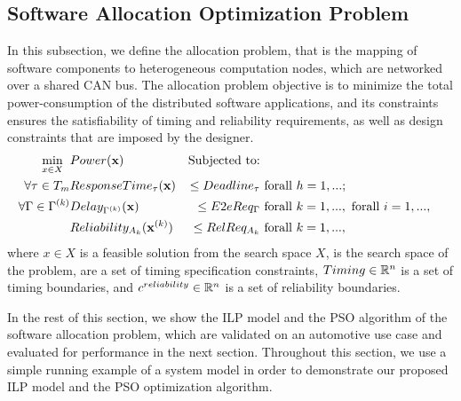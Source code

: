 \subsection{Software Allocation Optimization Problem	}\label{sec_allocation}
In this subsection, we define the allocation problem, that is the mapping of software components to heterogeneous computation nodes, which are networked over a shared CAN bus. The allocation problem objective is to minimize the total power-consumption of the distributed software applications, and its constraints ensures the satisfiability of timing and reliability requirements, as well as design constraints that are imposed by the designer.
\begin{align}
\label{eqn_optimization}
\min_{x\in X}\;\;& Power(\textbf{x}) & \text{Subjected to:} \\
\forall \tau\in T_{m} & ResponseTime_\tau(\x)&\leq Deadline_\tau& \mbox{ forall } h=1,...;\\ 
\label{eqn_e2e}
\forall \Gamma \in \ssp{\Gamma} & Delay_{\ssp{\Gamma}}(\x)&\leq E2eReq_\Gamma& \mbox{ forall } k=1,..., \mbox{ forall }i=1,...,\\
\label{eqn_reliability}
&\rel_{A_k}(\xsp{k})&\leq RelReq_{A_k} & \mbox{ forall } k=1,...,\\
\end{align}
where $x\in X$ is a feasible solution from the search space
$X$, is the search space of the problem,  are a set of timing specification constraints, $Timing\in \Bbb R^n$ is a set of timing boundaries, and $c^{reliability}\in \Bbb R^n$ is a set of reliability boundaries.

In the rest of this section, we show the ILP model and the PSO algorithm of the software allocation problem, which are validated on an automotive use case and evaluated for performance in the next section. Throughout this section, we use a simple running example of a system model in order to demonstrate our proposed ILP model and the PSO optimization algorithm.

